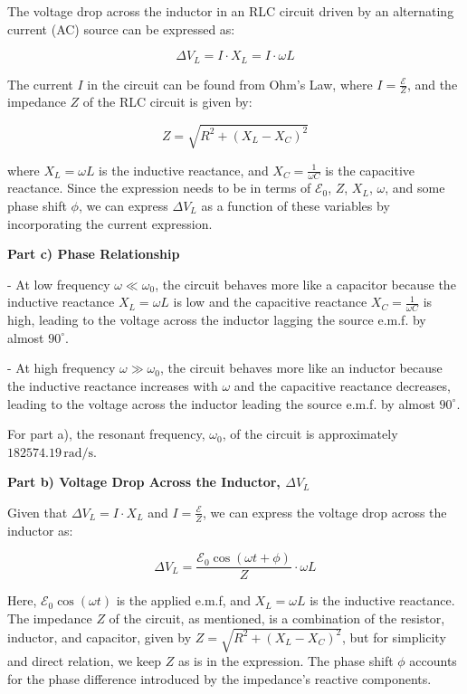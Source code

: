 The voltage drop across the inductor in an RLC circuit driven by an alternating current (AC) source can be expressed as:

\[
\Delta V_{L} = I \cdot X_{L} = I \cdot \omega L
\]

The current \(I\) in the circuit can be found from Ohm's Law, where \(I = \frac{\mathcal{E}}{Z}\), and the impedance \(Z\) of the RLC circuit is given by:

\[
Z = \sqrt{R^2 + (X_{L} - X_{C})^2}
\]

where \(X_{L} = \omega L\) is the inductive reactance, and \(X_{C} = \frac{1}{\omega C}\) is the capacitive reactance. Since the expression needs to be in terms of \(\mathcal{E}_{0}\), \(Z\), \(X_{L}\), \(\omega\), and some phase shift \(\phi\), we can express \(\Delta V_{L}\) as a function of these variables by incorporating the current expression.

\textbf{Part c) Phase Relationship}

- At low frequency \(\omega \ll \omega_{0}\), the circuit behaves more like a capacitor because the inductive reactance \(X_{L} = \omega L\) is low and the capacitive reactance \(X_{C} = \frac{1}{\omega C}\) is high, leading to the voltage across the inductor lagging the source e.m.f. by almost \(90^\circ\).

- At high frequency \(\omega \gg \omega_{0}\), the circuit behaves more like an inductor because the inductive reactance increases with \(\omega\) and the capacitive reactance decreases, leading to the voltage across the inductor leading the source e.m.f. by almost \(90^\circ\).

For part a), the resonant frequency, \( \omega_{0} \), of the circuit is approximately \( 182574.19 \, \text{rad/s} \).

\textbf{Part b) Voltage Drop Across the Inductor, \( \Delta V_{L} \)}

Given that \( \Delta V_{L} = I \cdot X_{L} \) and \( I = \frac{\mathcal{E}}{Z} \), we can express the voltage drop across the inductor as:

\[
\Delta V_{L} = \frac{\mathcal{E}_{0} \cos(\omega t + \phi)}{Z} \cdot \omega L
\]

Here, \(\mathcal{E}_{0} \cos(\omega t)\) is the applied e.m.f, and \(X_{L} = \omega L\) is the inductive reactance. The impedance \(Z\) of the circuit, as mentioned, is a combination of the resistor, inductor, and capacitor, given by \(Z = \sqrt{R^2 + (X_{L} - X_{C})^2}\), but for simplicity and direct relation, we keep \(Z\) as is in the expression. The phase shift \( \phi \) accounts for the phase difference introduced by the impedance's reactive components.

